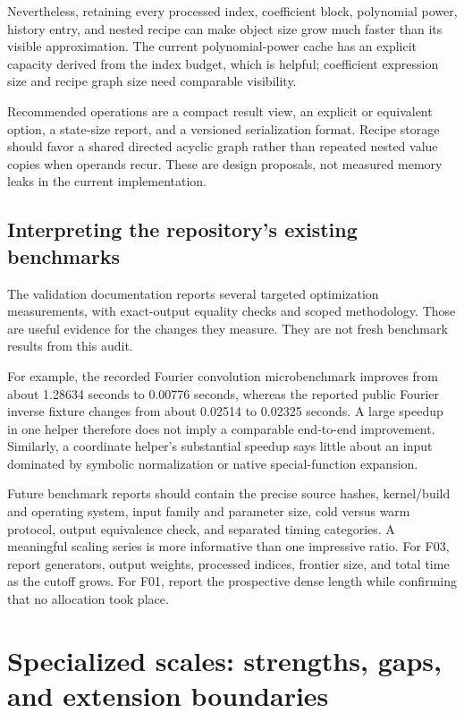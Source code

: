 \documentclass[11pt,a4paper]{article}
\newcommand{\code}[1]{\texttt{\detokenize{#1}}}
\theoremstyle{definition}
\begin{document}
Nevertheless, retaining every processed index, coefficient block, polynomial power, history entry, and nested recipe can make object size grow much faster than its visible approximation. The current polynomial-power cache has an explicit capacity derived from the index budget, which is helpful; coefficient expression size and recipe graph size need comparable visibility.\cite{incremental,refinement}

Recommended operations are a compact result view, an explicit \code{ForgetComputationState} or equivalent option, a state-size report, and a versioned serialization format. Recipe storage should favor a shared directed acyclic graph rather than repeated nested value copies when operands recur. These are design proposals, not measured memory leaks in the current implementation.

\subsection{Interpreting the repository's existing benchmarks}

The validation documentation reports several targeted optimization measurements, with exact-output equality checks and scoped methodology. Those are useful evidence for the changes they measure. They are not fresh benchmark results from this audit.\cite{validation}

For example, the recorded Fourier convolution microbenchmark improves from about 1.28634 seconds to 0.00776 seconds, whereas the reported public Fourier inverse fixture changes from about 0.02514 to 0.02325 seconds. A large speedup in one helper therefore does not imply a comparable end-to-end improvement. Similarly, a coordinate helper's substantial speedup says little about an input dominated by symbolic normalization or native special-function expansion.\cite{validation}

Future benchmark reports should contain the precise source hashes, kernel/build and operating system, input family and parameter size, cold versus warm protocol, output equivalence check, and separated timing categories. A meaningful scaling series is more informative than one impressive ratio. For F03, report generators, output weights, processed indices, frontier size, and total time as the cutoff grows. For F01, report the prospective dense length while confirming that no allocation took place.

\section{Specialized scales: strengths, gaps, and extension boundaries}
\label{sec:scales}
\end{document}
